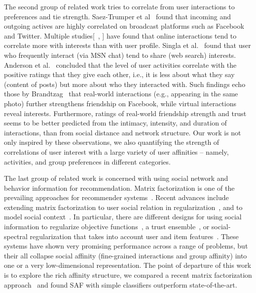 The second group of related work tries to correlate from user interactions to preferences and tie strength. 
Saez-Trumper et al~\cite{saez2011high} found that incoming and outgoing actives are
highly correlated on broadcast platforms such as Facebook and Twitter.
Multiple studies[~\cite{singla2008yes}, ] have found that online interactions
tend to correlate more with interests than with user profile. Singla et al.~\cite{singla2008yes} found that user who frequently interact (via MSN chat) tend to share (web search) interests. 
Anderson et al.~\cite{Anderson2012} concluded that the level of user activities correlate with the positive ratings that they give each other, i.e., it is less about what they say (content of posts) but more about who they interacted with. Such findings echo those by Brandtzag~\cite{brandtzag2011facebook}
that real-world interactions (e.g., appearing in the same photo) further strengthens friendship on Facebook, while virtual interactions reveal interests. Furthermore, ratings of real-world friendship strength and trust~\cite{gilbert2009predicting} seems to be better predicted from the intimacy, intensity, and duration of interactions, than from social distance and network structure. 
Our work is not only inspired by these observations, we also quantifying the strength of correlations 
of user interest with a large variety of user affinities -- namely, activities, and group preferences in different categories.

The last group of related work is concerned with using social network and behavior information for recommendation. 
Matrix factorization is one of the prevailing approaches for recommender systems~\cite{koren2009matrix}.
Recent advances include extending matrix factorization to user social relation in regularization~\cite{sr,rrmf}, 
and to model social context~\cite{Jiang2012SCR}. 
In particular, there are different designs for using social information to regularize objective functions~\cite{lla}, a trust
ensemble~\cite{ste}, 
or social-spectral regularization that takes into account user and item features~\cite{Noel2012NOF}.  These systems have shown very promising performance across a range of problems, but their all collapse social affinity (fine-grained interactions and group affinity) into one or a very low-dimensional representation. The point of departure of this work is to explore the rich affinity structure, we compared a recent matrix factorization approach~\cite{Noel2012NOF} and found SAF with simple classifiers outperform state-of-the-art.

